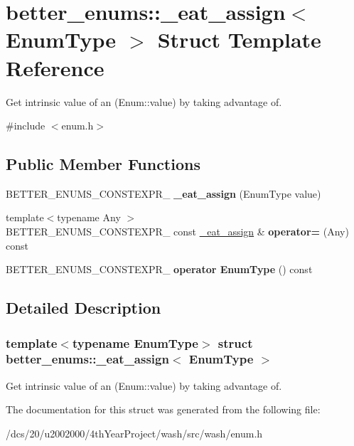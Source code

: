 \hypertarget{structbetter__enums_1_1__eat__assign}{}\section{better\+\_\+enums\+:\+:\+\_\+eat\+\_\+assign$<$ Enum\+Type $>$ Struct Template Reference}
\label{structbetter__enums_1_1__eat__assign}


Get intrinsic value of an (Enum\+::value) by taking advantage of.  




{\ttfamily \#include $<$enum.\+h$>$}

\subsection*{Public Member Functions}
\begin{DoxyCompactItemize}
\item 
\mbox{\label{structbetter__enums_1_1__eat__assign_a21d97fcaa410a1ed685e49d4da8276f4}} 
B\+E\+T\+T\+E\+R\+\_\+\+E\+N\+U\+M\+S\+\_\+\+C\+O\+N\+S\+T\+E\+X\+P\+R\+\_\+ {\bfseries \+\_\+eat\+\_\+assign} (Enum\+Type value)
\item 
\mbox{\label{structbetter__enums_1_1__eat__assign_a858981865baa842bda78015822dc16a7}} 
{\footnotesize template$<$typename Any $>$ }\\B\+E\+T\+T\+E\+R\+\_\+\+E\+N\+U\+M\+S\+\_\+\+C\+O\+N\+S\+T\+E\+X\+P\+R\+\_\+ const \mbox{\hyperlink{structbetter__enums_1_1__eat__assign}{\+\_\+eat\+\_\+assign}} \& {\bfseries operator=} (Any) const
\item 
\mbox{\label{structbetter__enums_1_1__eat__assign_af2ec236cc18347c97e19e588b53f6aed}} 
B\+E\+T\+T\+E\+R\+\_\+\+E\+N\+U\+M\+S\+\_\+\+C\+O\+N\+S\+T\+E\+X\+P\+R\+\_\+ {\bfseries operator Enum\+Type} () const
\end{DoxyCompactItemize}


\subsection{Detailed Description}
\subsubsection*{template$<$typename Enum\+Type$>$\newline
struct better\+\_\+enums\+::\+\_\+eat\+\_\+assign$<$ Enum\+Type $>$}

Get intrinsic value of an (Enum\+::value) by taking advantage of. 

The documentation for this struct was generated from the following file\+:\begin{DoxyCompactItemize}
\item 
/dcs/20/u2002000/4th\+Year\+Project/wash/src/wash/enum.\+h\end{DoxyCompactItemize}
